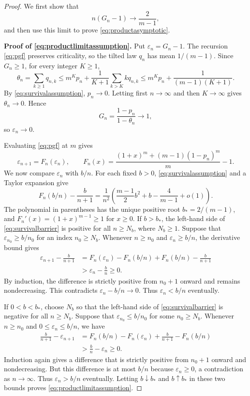 \documentclass[11pt,letterpaper,reqno]{amsart}
\numberwithin{equation}{section}
\theoremstyle{plain}
\theoremstyle{remark}
\begin{document}
\begin{proof}
We first show that
\begin{equation}\label{eq:productlimitassumption}
 n(G_n-1)\longrightarrow\frac2{m-1},
\end{equation}
and then use this limit to prove \eqref{eq:productasymptotic}.

\textbf{Proof of \eqref{eq:productlimitassumption}.}
Put $\varepsilon_n=G_n-1$. The recursion \eqref{eq:pgf} preserves
criticality, so the tilted law $q_n$ has mean $1/(m-1)$.
Since $G_n\ge1$, for every integer $K\ge1$,
\[
 \theta_n=\sum_{k\ge1}q_{n,k}
 \le m^Kp_n+\frac1{K+1}\sum_{k>K}kq_{n,k}
 \le m^Kp_n+\frac1{(m-1)(K+1)}.
\]
By \eqref{eq:survivalassumption}, $p_n\to0$. Letting first $n\to\infty$
and then $K\to\infty$ gives $\theta_n\to0$. Hence
\[
 G_n=\frac{1-p_n}{1-\theta_n}\longrightarrow1,
\]
so $\varepsilon_n\to0$.

Evaluating \eqref{eq:pgf} at $m$ gives
\[
 \varepsilon_{n+1}=F_n(\varepsilon_n),\qquad
 F_n(x)=\frac{(1+x)^m+(m-1)(1-p_n)^m}{m}-1.
\]
We now compare $\varepsilon_n$ with $b/n$. For each fixed $b>0$,
\eqref{eq:survivalassumption} and a Taylor expansion give
\begin{equation}\label{eq:survivalbarrier}
 F_n(b/n)-\frac b{n+1}
 =\frac1{n^2}\left(\frac{m-1}{2}b^2+b-\frac4{m-1}+o(1)\right).
\end{equation}
The polynomial in parentheses has the unique positive root
$b_*=2/(m-1)$, and $F_n'(x)=(1+x)^{m-1}\ge1$ for $x\ge0$.
If $b>b_*$, the left-hand side of \eqref{eq:survivalbarrier} is positive
for all $n\ge N_b$, where $N_b\ge1$. Suppose that
$\varepsilon_{n_0}\ge b/n_0$ for an index $n_0\ge N_b$.
Whenever $n\ge n_0$ and $\varepsilon_n\ge b/n$, the derivative bound gives
\[
\begin{aligned}
 \varepsilon_{n+1}-\frac b{n+1}
 &=F_n(\varepsilon_n)-F_n(b/n)
   +F_n(b/n)-\frac b{n+1}\\
 &>\varepsilon_n-\frac bn\ge0.
\end{aligned}
\]
By induction, the difference is strictly positive from $n_0+1$ onward
and remains nondecreasing. This contradicts
$\varepsilon_n-b/n\to0$. Thus $\varepsilon_n<b/n$ eventually.

If $0<b<b_*$, choose $N_b$ so that the left-hand side of
\eqref{eq:survivalbarrier} is negative for all $n\ge N_b$.
Suppose that $\varepsilon_{n_0}\le b/n_0$ for some $n_0\ge N_b$.
Whenever $n\ge n_0$ and $0\le\varepsilon_n\le b/n$, we have
\[
\begin{aligned}
 \frac b{n+1}-\varepsilon_{n+1}
 &=F_n(b/n)-F_n(\varepsilon_n)
   +\frac b{n+1}-F_n(b/n)\\
 &>\frac bn-\varepsilon_n\ge0.
\end{aligned}
\]
Induction again gives a difference that is strictly positive from
$n_0+1$ onward and nondecreasing. But this difference is at most $b/n$
because $\varepsilon_n\ge0$, a contradiction as $n\to\infty$.
Thus $\varepsilon_n>b/n$ eventually.
Letting $b\downarrow b_*$ and $b\uparrow b_*$ in these two bounds proves
\eqref{eq:productlimitassumption}.


\end{proof}
\end{document}
